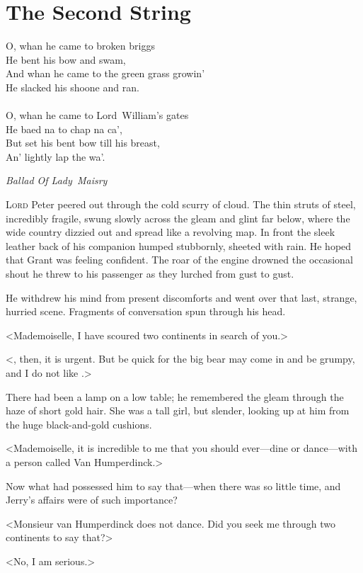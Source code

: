 
\chapter{The Second String}

\epigraph{ O, whan he came to broken briggs\\ He bent his bow and swam,\\ And whan he came to the green grass growin'\\ He slacked his shoone and ran.\\ ~\\ O, whan he came to Lord~William's gates\\ He baed na to chap na ca',\\ But set his bent bow till his breast,\\ An' lightly lap the wa'.}{\textit{Ballad Of Lady~Maisry}}


\lettrine{L}{ord} Peter peered out through the cold scurry of cloud. The thin struts of steel, incredibly fragile, swung slowly across the gleam and glint far below, where the wide country dizzied out and spread like a revolving map. In front the sleek leather back of his companion humped stubbornly, sheeted with rain. He hoped that Grant was feeling confident. The roar of the engine drowned the occasional shout he threw to his passenger as they lurched from gust to gust.

He withdrew his mind from present discomforts and went over that last, strange, hurried scene. Fragments of conversation spun through his head.

<Mademoiselle, I have scoured two continents in search of you.>

<, then, it is urgent. But be quick for the big bear may come in and be grumpy, and I do not like .>

There had been a lamp on a low table; he remembered the gleam through the haze of short gold hair. She was a tall girl, but slender, looking up at him from the huge black-and-gold cushions.

<Mademoiselle, it is incredible to me that you should ever—dine or dance—with a person called Van Humperdinck.>

Now what had possessed him to say that—when there was so little time, and Jerry's affairs were of such importance?

<Monsieur van Humperdinck does not dance. Did you seek me through two continents to say that?>

<No, I am serious.>

